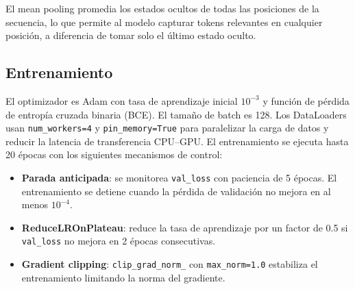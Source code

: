 \documentclass[letterpaper, 10 pt, conference]{ieeeconf}
\begin{document}
\begin{table}[h]
\centering
\caption{Capas del modelo \texttt{SentimentBiLSTM}.}
\label{tab:arquitectura}
\end{table}

El mean pooling promedia los estados ocultos de todas las posiciones de la
secuencia, lo que permite al modelo capturar tokens relevantes en cualquier
posici\'on, a diferencia de tomar solo el \'ultimo estado oculto.

\subsection{Entrenamiento}

El optimizador es Adam con tasa de aprendizaje inicial $10^{-3}$ y funci\'on
de p\'erdida de entrop\'ia cruzada binaria (BCE). El tama\~no de batch es
128. Los DataLoaders usan \texttt{num\_workers=4} y \texttt{pin\_memory=True}
para paralelizar la carga de datos y reducir la latencia de transferencia
CPU--GPU. El entrenamiento se ejecuta hasta 20 \'epocas con los siguientes
mecanismos de control:

\begin{itemize}
  \item \textbf{Parada anticipada}: se monitorea \texttt{val\_loss} con
        paciencia de 5 \'epocas. El entrenamiento se detiene cuando la
        p\'erdida de validaci\'on no mejora en al menos $10^{-4}$.
  \item \textbf{ReduceLROnPlateau}: reduce la tasa de aprendizaje por un
        factor de 0.5 si \texttt{val\_loss} no mejora en 2 \'epocas
        consecutivas.
  \item \textbf{Gradient clipping}: \texttt{clip\_grad\_norm\_} con
        \texttt{max\_norm=1.0} estabiliza el entrenamiento limitando la
        norma del gradiente.
\end{itemize}
\end{document}
